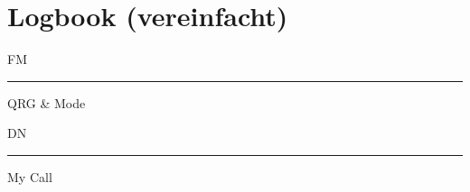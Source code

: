 \documentclass[a4paper,10pt]{article}
\begin{document}
  \clearpage

\section{Logbook (vereinfacht)}
  \label{att:log0}

  \bigskip
  \hspace{1cm}
  \begin{minipage}[t]{0.33\textwidth}
    \hspace{3cm} {\Large FM}\vspace{0.5em}
      \centering
      \hrule
      \vspace{0.5ex}
      \small QRG \& Mode
  \end{minipage}
  \hfill
  \begin{minipage}[t]{0.33\textwidth}
    \hspace{-2cm} {\Large DN}\vspace{0.5em}
      \centering
      \hrule
      \vspace{0.5ex}
      \small My Call
  \end{minipage}
  \hspace{1cm}
\end{document}
